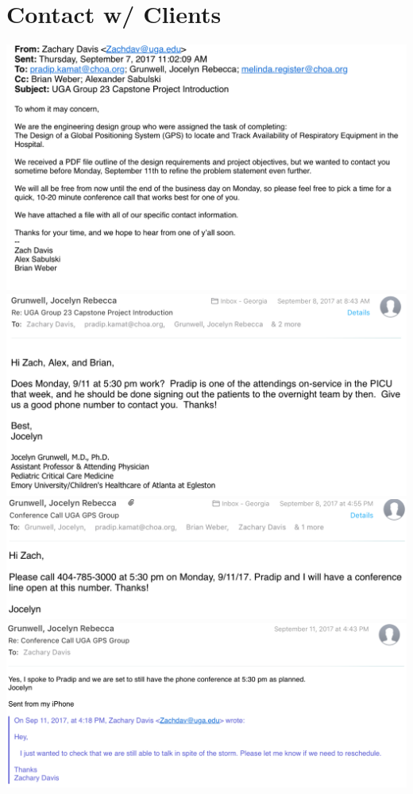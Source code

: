 \documentclass[12pt]{article}
\begin{document}
\section{Contact w/ Clients}
	\begin{center}
		\includegraphics[scale=0.8]{1.png}\\
		\includegraphics[scale=0.8]{2.png}\\
		\includegraphics[scale=0.8]{3.png}\\
		\includegraphics[scale=0.8]{4.png}\\

\end{center}
\end{document}
